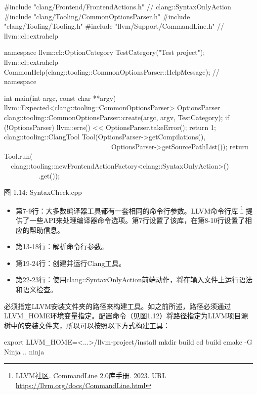\begin{cpp}
#include "clang/Frontend/FrontendActions.h" // clang::SyntaxOnlyAction
#include "clang/Tooling/CommonOptionsParser.h"
#include "clang/Tooling/Tooling.h"
#include "llvm/Support/CommandLine.h" // llvm::cl::extrahelp

namespace {
  llvm::cl::OptionCategory TestCategory("Test project");
  llvm::cl::extrahelp
    CommonHelp(clang::tooling::CommonOptionsParser::HelpMessage);
} // namespace

int main(int argc, const char **argv) {
  llvm::Expected<clang::tooling::CommonOptionsParser> OptionsParser =
    clang::tooling::CommonOptionsParser::create(argc, argv, TestCategory);
  if (!OptionsParser) {
    llvm::errs() << OptionsParser.takeError();
    return 1;
  }
  clang::tooling::ClangTool Tool(OptionsParser->getCompilations(),
                                 OptionsParser->getSourcePathList());
  return Tool.run(
    clang::tooling::newFrontendActionFactory<clang::SyntaxOnlyAction>()
            .get());
}
\end{cpp}

\begin{center}
图 1.14: SyntaxCheck.cpp
\end{center}

\begin{itemize}
\item
第7-9行：大多数编译器工具都有一套相同的命令行参数。LLVM命令行库 \footnote{LLVM社区. CommandLine 2.0库手册. 2023. URL \url{https://llvm.org/docs/CommandLine.html}} 提供了一些API来处理编译器命令选项。第7行设置了该库，在第8-10行设置了相应的帮助信息。

\item
第13-18行：解析命令行参数。

\item
第19-24行：创建并运行Clang工具。

\item
第22-23行：使用clang::SyntaxOnlyAction前端动作，将在输入文件上运行语法和语义检查。
\end{itemize}

必须指定LLVM安装文件夹的路径来构建工具。如之前所述，路径必须通过LLVM\_HOME环境变量指定。配置命令（见图1.12）将路径指定为LLVM项目源树中的安装文件夹，所以可以按照以下方式构建工具：

\begin{shell}
export LLVM_HOME=<...>/llvm-project/install
mkdir build
cd build
cmake -G Ninja ..
ninja
\end{shell}

